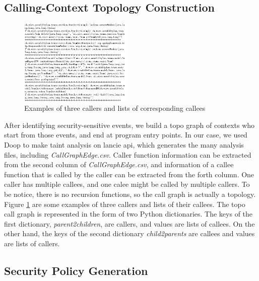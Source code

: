 \subsection{Calling-Context Topology Construction}

\begin{figure}[tbp]
  \centering
  \includegraphics[width=0.48\textwidth]{img/caller2callee.png}
  \caption{Examples of three callers and lists of corresponding callees}
  \label{caller2callee}
\end{figure}

After identifying security-sensitive events, we build a topo graph of contexts
who start from those events, and end at program entry points. In our case, we
used Doop to make taint analysis on lancie api, which generates the many
analysis files, including \textit{CallGraphEdge.csv}. Caller function
information can be extracted from the second column of
\textit{CallGraphEdge.csv}, and information of a callee function that is called
by the caller can be extracted from the forth column. One caller has multiple
callees, and one calee might be called by multiple callers. To be notice, there
is no recursion functions, so the call graph is actually a topology. Figure
\ref{caller2callee} are some examples of three callers and lists of their
callees. The topo call graph is represented in the form of two Python
dictionaries. The keys of the first dictionary, \textit{parent2children}, are
callers, and values are lists of callees. On the other hand, the keys of the
second dictionary \textit{child2parents} are callees and values are lists of
callers.


\subsection{Security Policy Generation}

